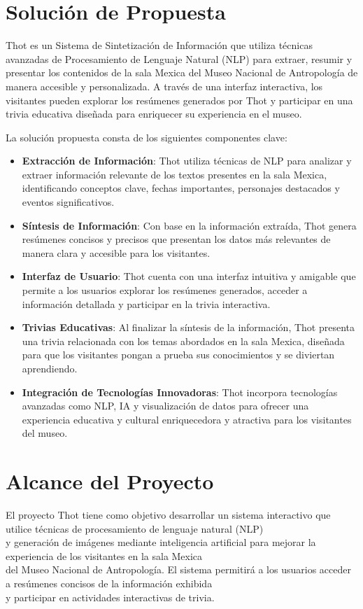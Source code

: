 \documentclass{report}
\begin{document}
    \section{Solución de Propuesta}
    \justifying
    Thot es un Sistema de Sintetización de Información que utiliza técnicas avanzadas de Procesamiento de Lenguaje Natural (NLP) para extraer, resumir y presentar los contenidos de la sala Mexica del Museo Nacional de Antropología de manera accesible y personalizada. A través de una interfaz interactiva, los visitantes pueden explorar los resúmenes generados por Thot y participar en una trivia educativa diseñada para enriquecer su experiencia en el museo.
    
        
    La solución propuesta consta de los siguientes componentes clave:
        
    \begin{itemize}
        \item \textbf{Extracción de Información}: Thot utiliza técnicas de NLP para analizar y extraer información relevante de los textos presentes en la sala Mexica, identificando conceptos clave, fechas importantes, personajes destacados y eventos significativos.
        \item \textbf{Síntesis de Información}: Con base en la información extraída, Thot genera resúmenes concisos y precisos que presentan los datos más relevantes de manera clara y accesible para los visitantes.
        \item \textbf{Interfaz de Usuario}: Thot cuenta con una interfaz intuitiva y amigable que permite a los usuarios explorar los resúmenes generados, acceder a información detallada y participar en la trivia interactiva.
        \item \textbf{Trivias Educativas}: Al finalizar la síntesis de la información, Thot presenta una trivia relacionada con los temas abordados en la sala Mexica, diseñada para que los visitantes pongan a prueba sus conocimientos y se diviertan aprendiendo.
        \item \textbf{Integración de Tecnologías Innovadoras}: Thot incorpora tecnologías avanzadas como NLP, IA y visualización de datos para ofrecer una experiencia educativa y cultural enriquecedora y atractiva para los visitantes del museo.
    \end{itemize}
        
    \section{Alcance del Proyecto}
    \justifying
        El proyecto Thot tiene como objetivo desarrollar un sistema interactivo que utilice técnicas de procesamiento de lenguaje natural (NLP)\\
        y generación de imágenes mediante inteligencia artificial para mejorar la experiencia de los visitantes en la sala Mexica\\
        del Museo Nacional de Antropología. El sistema permitirá a los usuarios acceder a resúmenes concisos de la información exhibida\\ 
        y participar en actividades interactivas de trivia.
     
\end{document}
